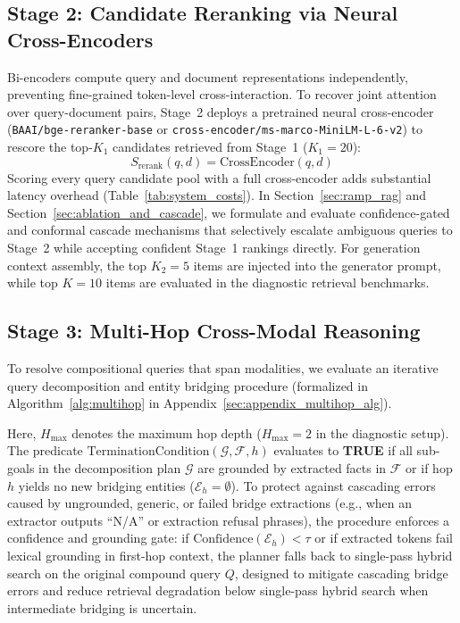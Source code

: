 \documentclass[conference]{IEEEtran}
\begin{document}
\subsection{Stage 2: Candidate Reranking via Neural Cross-Encoders}
Bi-encoders compute query and document representations independently, preventing fine-grained token-level cross-interaction. To recover joint attention over query-document pairs, Stage~2 deploys a pretrained neural cross-encoder (\texttt{BAAI/bge-reranker-base} or \texttt{cross-encoder/ms-marco-MiniLM-L-6-v2}) to rescore the top-$K_1$ candidates retrieved from Stage~1 ($K_1 = 20$):
\begin{equation}
    S_{\text{rerank}}(q, d) = \text{CrossEncoder}(q, d)
\end{equation}
Scoring every query candidate pool with a full cross-encoder adds substantial latency overhead (Table~\ref{tab:system_costs}). In Section~\ref{sec:ramp_rag} and Section~\ref{sec:ablation_and_cascade}, we formulate and evaluate confidence-gated and conformal cascade mechanisms that selectively escalate ambiguous queries to Stage~2 while accepting confident Stage~1 rankings directly. For generation context assembly, the top $K_2 = 5$ items are injected into the generator prompt, while top $K = 10$ items are evaluated in the diagnostic retrieval benchmarks.

\subsection{Stage 3: Multi-Hop Cross-Modal Reasoning}
To resolve compositional queries that span modalities, we evaluate an iterative query decomposition and entity bridging procedure (formalized in Algorithm~\ref{alg:multihop} in Appendix~\ref{sec:appendix_multihop_alg}).

Here, $H_{\max}$ denotes the maximum hop depth ($H_{\max} = 2$ in the diagnostic setup). The predicate $\text{TerminationCondition}(\mathcal{G}, \mathcal{F}, h)$ evaluates to \textbf{TRUE} if all sub-goals in the decomposition plan $\mathcal{G}$ are grounded by extracted facts in $\mathcal{F}$ or if hop $h$ yields no new bridging entities ($\mathcal{E}_h = \emptyset$). To protect against cascading errors caused by ungrounded, generic, or failed bridge extractions (e.g., when an extractor outputs ``N/A'' or extraction refusal phrases), the procedure enforces a confidence and grounding gate: if $\text{Confidence}(\mathcal{E}_h) < \tau$ or if extracted tokens fail lexical grounding in first-hop context, the planner falls back to single-pass hybrid search on the original compound query $Q$, designed to mitigate cascading bridge errors and reduce retrieval degradation below single-pass hybrid search when intermediate bridging is uncertain.
\end{document}
